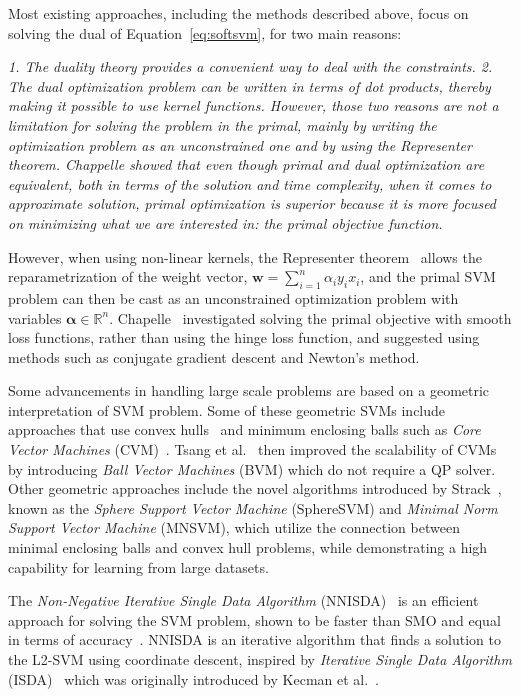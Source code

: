 \documentclass[reqno]{vcuthesis}
\newcommand{\reals}{{\mathbb{R}}}
\numberwithin{equation}{chapter}
\begin{document}
Most existing approaches, including the methods described above, focus on solving the dual of Equation~\ref{eq:softsvm}, for two main reasons:

\textit{1. The duality theory provides a convenient way to deal with the constraints.
2. The dual optimization problem can be written in terms of dot products, thereby making it possible to use kernel functions. However, those two reasons are not a limitation for solving the problem in the primal, mainly by writing the optimization problem as an unconstrained one and by using the Representer theorem. Chappelle showed that even though primal and dual optimization are equivalent, both in terms of the solution and time complexity, when it comes to approximate solution, primal optimization is superior because it is more focused on minimizing what we are interested in: the primal objective function.}

However, when using non-linear kernels, the Representer theorem~\cite{scholkopf2001generalized} allows the reparametrization of the weight vector, $\bm w = \sum_{i=1}^n \alpha_i y_i x_i$, and the primal SVM problem can then be cast as an unconstrained optimization problem with variables $\bm \alpha \in \reals^n$. Chapelle~\cite{Chapelle2007} investigated solving the primal objective with smooth loss functions, rather than using the hinge loss function, and suggested using methods such as conjugate gradient descent and Newton's method.

Some advancements in handling large scale problems are based on a geometric interpretation of SVM problem. Some of these geometric SVMs include approaches that use convex hulls~\cite{bennett2000duality} and minimum enclosing balls such as \textit{Core Vector Machines} (CVM)~\cite{tsang2005core}. Tsang et al.~\cite{tsang2007simpler} then improved the scalability of CVMs by introducing \textit{Ball Vector Machines} (BVM) which do not require a QP solver. Other geometric approaches include the novel algorithms introduced by Strack~\cite{strack2013geometric}, known as the \textit{Sphere Support Vector Machine} (SphereSVM) and \textit{Minimal Norm Support Vector Machine} (MNSVM), which utilize the connection between minimal enclosing balls and convex hull problems, while demonstrating a high capability for learning from large datasets. 

The \textit{Non-Negative Iterative Single Data Algorithm} (NNISDA)~\cite{zigic2016} is an efficient approach for solving the SVM problem, shown to be faster than SMO and equal in terms of accuracy~\cite{Kecman2014}. NNISDA is an iterative algorithm that finds a solution to the L2-SVM using coordinate descent, inspired by \textit{Iterative Single Data Algorithm} (ISDA)~\cite{Huang2006} which was originally introduced by Kecman et al.~\cite{Kecman2005}.
\end{document}
